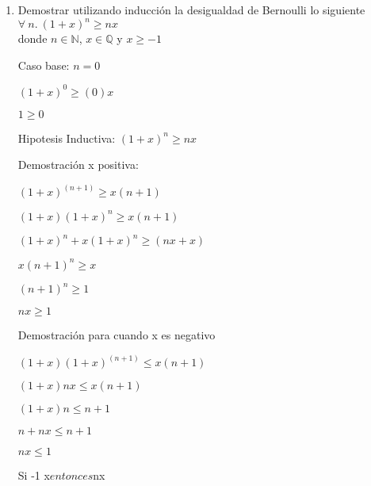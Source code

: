 \documentclass{article}
\begin{document}
\begin{enumerate}

    \item Demostrar utilizando inducci\'on la desigualdad de Bernoulli lo siguiente $\forall\ n.\ (1+x)^n\geq nx $\\donde $n\in \mathbb{N}$, $x\in \mathbb{Q}$ y $x\geq -1$ \par

    Caso base: $n=0$ \par

    $ (1+x)^0\geq (0)x$ \par

    $1\geq 0$\par

    Hipotesis Inductiva: $ (1+x)^n\geq nx\ $ \par

    Demostración x positiva: \par

    $(1+x)^{(n+1)} \geq x(n+1)$ \par

    $(1+x)(1+x)^n\geq x(n+1) $ \par

    $(1+x)^n+x(1+x)^n\geq (nx+x)$ \par

    $x(n+1)^n\geq x$ \par

    $(n+1)^n \geq 1$\par

    $nx \geq 1$\par

    Demostración para cuando x es negativo \par

    $(1+x)(1+x)^{(n+1)}\leq x(n+1)$\par 

    $(1+x)nx\leq x(n+1)$\par

    $(1+x)n\leq n+1$\par

    $n+nx\leq n+1$\par

    $nx\leq 1$ \par

    Si -1 \leq x$ entonces $nx

\end{enumerate}
\end{document}
